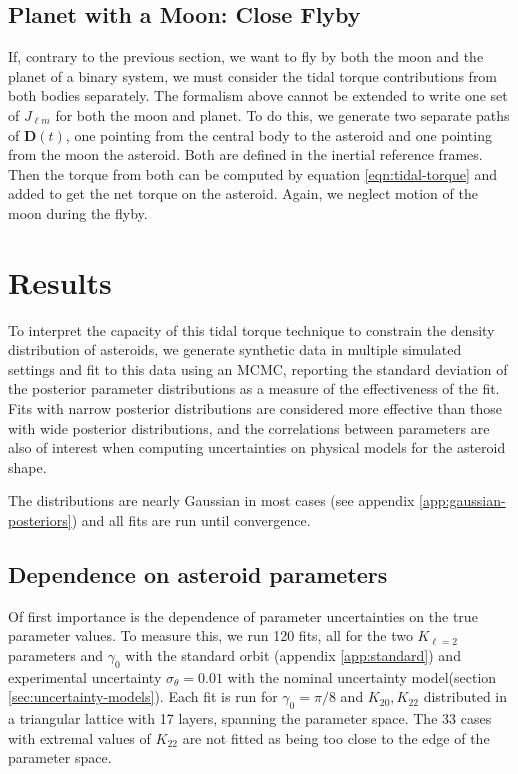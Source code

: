 \documentclass{aastex631}
\begin{document}
\subsection{Planet with a Moon: Close Flyby}
If, contrary to the previous section, we want to fly by both the moon and the planet of a binary system, we must consider the tidal torque contributions from both bodies separately. The formalism above cannot be extended to write one set of $J_{\ell m}$ for both the moon and planet. To do this, we generate two separate paths of $\mathbf D(t)$, one pointing from the central body to the asteroid and one pointing from the moon the asteroid. Both are defined in the inertial reference frames. Then the torque from both can be computed by equation \ref{eqn:tidal-torque} and added to get the net torque on the asteroid. Again, we neglect motion of the moon during the flyby.



\section{Results}
To interpret the capacity of this tidal torque technique to constrain the density distribution of asteroids, we generate synthetic data in multiple simulated settings and fit to this data using an MCMC, reporting the standard deviation of the posterior parameter distributions as a measure of the effectiveness of the fit. Fits with narrow posterior distributions are considered more effective than those with wide posterior distributions, and the correlations between parameters are also of interest when computing uncertainties on physical models for the asteroid shape.

The distributions are nearly Gaussian in most cases (see appendix \ref{app:gaussian-posteriors}) and all fits are run until convergence.

\subsection{Dependence on asteroid parameters}
\label{sec:probe-space}
Of first importance is the dependence of parameter uncertainties on the true parameter values. To measure this, we run 120 fits, all for the two $K_{\ell = 2}$ parameters and $\gamma_0$ with the standard orbit (appendix \ref{app:standard}) and experimental uncertainty $\sigma_\theta = 0.01$ with the nominal uncertainty model(section \ref{sec:uncertainty-models}). Each fit is run for $\gamma_0=\pi/8$ and $K_{20}, K_{22}$ distributed in a triangular lattice with 17 layers, spanning the parameter space. The 33 cases with extremal values of $K_{22}$ are not fitted as being too close to the edge of the parameter space.
\end{document}
